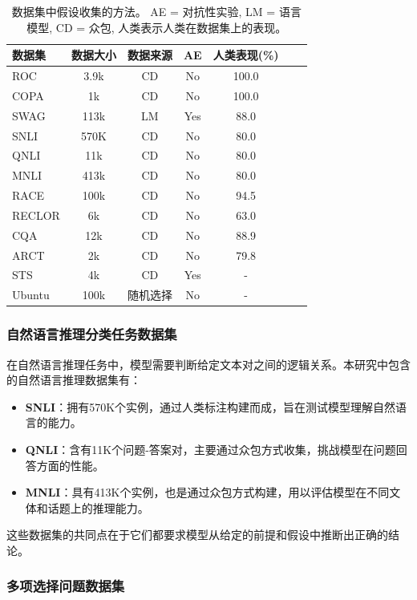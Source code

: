 \begin{table}[h]
\small
\centering
\begin{tabular}{lcccccc}
\toprule
\textbf{数据集} &数据大小 & 数据来源& AE& 人类表现(\%)\\ \midrule
ROC & 3.9k & CD &No &100.0 \\
COPA & 1k & CD &No &100.0 \\
SWAG & 113k & LM &Yes & 88.0\\
SNLI & 570K & CD &No &80.0\\
QNLI & 11k & CD &No &80.0\\
MNLI & 413k & CD & No &80.0\\
RACE & 100k & CD &No &94.5\\
RECLOR & 6k & CD &No &63.0\\
CQA & 12k & CD &No &88.9\\
ARCT & 2k & CD &No &79.8\\
STS& 4k & CD &Yes & - \\
Ubuntu & 100k &随机选择 & No & - \\
\bottomrule
\end{tabular}
\caption{\label{dataset_intro} 数据集中假设收集的方法。
AE = 对抗性实验, LM = 语言模型, CD = 众包, 人类表示人类在数据集上的表现。}
\end{table}


\subsubsection*{自然语言推理分类任务数据集}

在自然语言推理任务中，模型需要判断给定文本对之间的逻辑关系。本研究中包含的自然语言推理数据集有：

\begin{itemize}
    \item \textbf{SNLI}\cite{bowman2015large}：拥有570K个实例，通过人类标注构建而成，旨在测试模型理解自然语言的能力。
    \item \textbf{QNLI}\cite{wang2018glue}：含有11K个问题-答案对，主要通过众包方式收集，挑战模型在问题回答方面的性能。
    \item \textbf{MNLI}\cite{williams2018broad}：具有413K个实例，也是通过众包方式构建，用以评估模型在不同文体和话题上的推理能力。
\end{itemize}

这些数据集的共同点在于它们都要求模型从给定的前提和假设中推断出正确的结论。

\subsubsection*{多项选择问题数据集}

